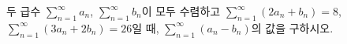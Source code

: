 두 급수 $\displaystyle\sum_{n=1}^{\infty} a_n$, $\displaystyle\sum_{n=1}^{\infty} b_n$이 모두 수렴하고 $\displaystyle\sum_{n=1}^{\infty}(2a_n+b_n)=8$, $\displaystyle\sum_{n=1}^{\infty}(3a_n+2b_n)=26$일 때, $\displaystyle\sum_{n=1}^{\infty}(a_n-b_n)$의 값을 구하시오.
